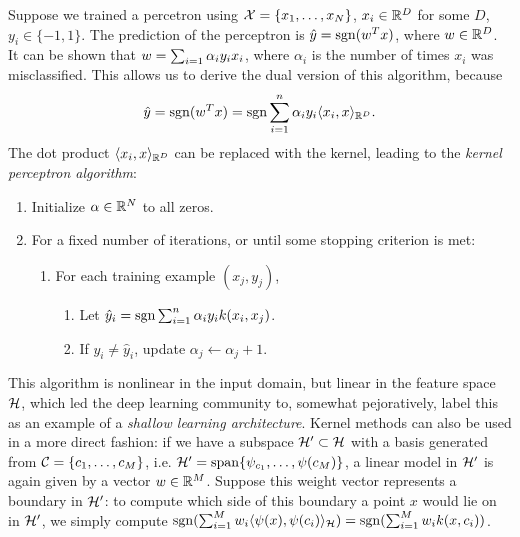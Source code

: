 Suppose we trained a percetron using $\mathcal{X}=\{x_1, \dots, x_{N}\}$, $x_i\in\mathbb{R}^D$ for some $D$, $y_i\in\{-1, 1\}$.
The prediction of the perceptron is $\hat{y}=\mathrm{sgn}(w^Tx)$, where $w\in\mathbb{R}^D$. It can be shown that 
$w=\sum_{i=1}\alpha_iy_ix_i$, where $\alpha_i$ is the number of times $x_i$ was misclassified. This allows us
to derive the dual version of this algorithm, because
\begin{align*}
 \hat{y} = \mathrm{sgn}(w^Tx) = \mathrm{sgn}\sum_{i=1}^n\alpha_iy_i\langle x_i, x\rangle_{\mathbb{R}^D}.
\end{align*}
The dot product $\langle x_i, x\rangle_{\mathbb{R}^D}$ can be replaced with the kernel, leading to the \emph{kernel perceptron algorithm}:
\begin{enumerate}
 \item Initialize $\alpha\in\mathbb{R}^{N}$ to all zeros. 
 \item For a fixed number of iterations, or until some stopping criterion is met:
       \begin{enumerate}
        \item For each training example $(x_j, y_j)$,
              \begin{enumerate}
               \item Let $\hat{y}_i=\mathrm{sgn}\sum_{i=1}^n\alpha_iy_ik(x_i, x_j)$.
               \item If $y_i\neq\hat{y}_i$, update $\alpha_j \leftarrow \alpha_j + 1$.
              \end{enumerate}
       \end{enumerate}
\end{enumerate}
This algorithm is nonlinear in the input domain, but linear in the feature space $\mathcal{H}$, which led the deep learning community to,
somewhat pejoratively, label this as an example of a \emph{shallow learning architecture}.
Kernel methods can also be used in a more direct fashion: if we have a subspace $\mathcal{H}'\subset\mathcal{H}$ with a basis generated
from $\mathcal{C} = \{c_1,\dots,c_{M}\}$, i.e. $\mathcal{H}' = \operatorname{span}\{\psi_{c_1},\dots,\psi(c_{M})\}$,
a linear model in $\mathcal{H}'$ is again given
by a vector $w\in\mathbb{R}^{M}$. Suppose this weight vector represents a boundary in $\mathcal{H}'$: 
to compute which side of this boundary a point $x$ would lie on in $\mathcal{H}'$,
we simply compute $\mathrm{sgn}(\sum_{i=1}^{M}w_i\langle\psi(x), \psi(c_i) \rangle_{\mathcal{H}}) = \mathrm{sgn}(\sum_{i=1}^{M}w_ik(x,c_i))$.
